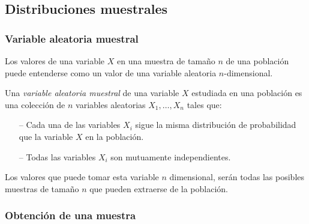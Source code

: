 \subsection{Distribuciones muestrales}
\begin{frame}
\frametitle{Variable aleatoria muestral}
Los valores de una variable $X$ en una muestra de tamaño $n$ de una población puede entenderse como un valor de una
variable aleatoria $n$-dimensional.

\begin{definicion}
Una \emph{variable aleatoria muestral} de una variable $X$ estudiada en una población es una colección de $n$
variables aleatorias $X_1,\ldots,X_n$ tales que:
\begin{itemize}
\item[--] Cada una de las variables $X_i$ sigue la misma distribución de probabilidad que la variable $X$ en
la población.
\item[--] Todas las variables $X_i$ son mutuamente independientes. 
\end{itemize}
\end{definicion}

Los valores que puede tomar esta variable $n$ dimensional, serán todas las posibles muestras de tamaño $n$ que pueden
extraerse de la población.
\end{frame}


\begin{frame}
\frametitle{Obtención de una muestra}
\begin{center}

\end{center}
\end{frame}


